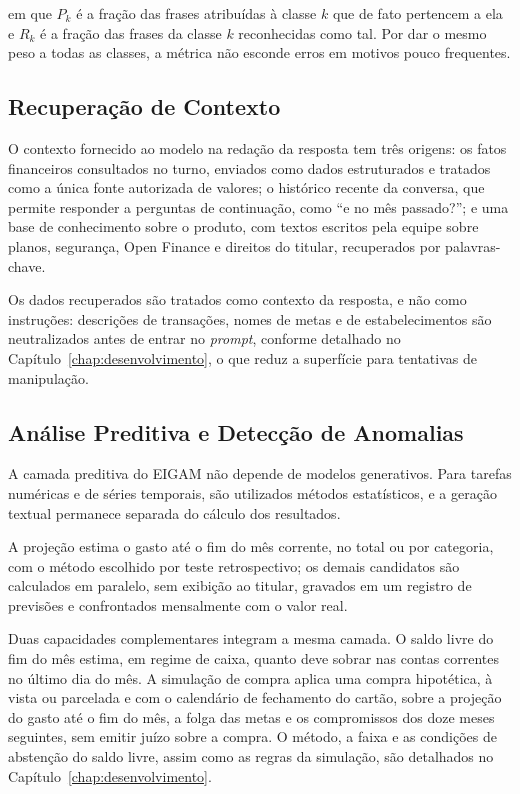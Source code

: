 \noindent em que $P_k$ é a fração das frases atribuídas à classe $k$ que de fato pertencem a ela e $R_k$ é a fração das frases da classe $k$ reconhecidas como tal. Por dar o mesmo peso a todas as classes, a métrica não esconde erros em motivos pouco frequentes.

\subsection{Recuperação de Contexto}

O contexto fornecido ao modelo na redação da resposta tem três origens: os fatos financeiros consultados no turno, enviados como dados estruturados e tratados como a única fonte autorizada de valores; o histórico recente da conversa, que permite responder a perguntas de continuação, como ``e no mês passado?''; e uma base de conhecimento sobre o produto, com textos escritos pela equipe sobre planos, segurança, Open Finance e direitos do titular, recuperados por palavras-chave.

Os dados recuperados são tratados como contexto da resposta, e não como instruções: descrições de transações, nomes de metas e de estabelecimentos são neutralizados antes de entrar no \textit{prompt}, conforme detalhado no Capítulo~\ref{chap:desenvolvimento}, o que reduz a superfície para tentativas de manipulação.

\subsection{Análise Preditiva e Detecção de Anomalias}

A camada preditiva do EIGAM não depende de modelos generativos. Para tarefas numéricas e de séries temporais, são utilizados métodos estatísticos, e a geração textual permanece separada do cálculo dos resultados.

A projeção estima o gasto até o fim do mês corrente, no total ou por categoria, com o método escolhido por teste retrospectivo; os demais candidatos são calculados em paralelo, sem exibição ao titular, gravados em um registro de previsões e confrontados mensalmente com o valor real.

Duas capacidades complementares integram a mesma camada. O saldo livre do fim do mês estima, em regime de caixa, quanto deve sobrar nas contas correntes no último dia do mês. A simulação de compra aplica uma compra hipotética, à vista ou parcelada e com o calendário de fechamento do cartão, sobre a projeção do gasto até o fim do mês, a folga das metas e os compromissos dos doze meses seguintes, sem emitir juízo sobre a compra. O método, a faixa e as condições de abstenção do saldo livre, assim como as regras da simulação, são detalhados no Capítulo~\ref{chap:desenvolvimento}.

